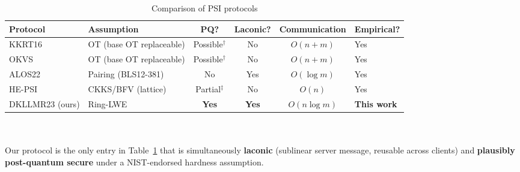 \begin{table}[H]
\centering
\caption{Comparison of PSI protocols}
\label{tab:psi-comparison}
\begin{tabular}{@{}llcccl@{}}
\toprule
\textbf{Protocol} & \textbf{Assumption} & \textbf{PQ?} & \textbf{Laconic?} & \textbf{Communication} & \textbf{Empirical?} \\
\midrule
KKRT16~\cite{kolesnikov2016kkrt}  & OT (base OT replaceable) & Possible$^\dagger$ & No  & $O(n + m)$ & Yes \\
OKVS~\cite{garimella2023okvs}     & OT (base OT replaceable) & Possible$^\dagger$ & No  & $O(n + m)$ & Yes \\
ALOS22~\cite{alos2022}            & Pairing (BLS12-381)      & No                 & Yes & $O(\log m)$ & Yes \\
HE-PSI~\cite{chen2017fhe}         & CKKS/BFV (lattice)       & Partial$^\ddagger$ & No  & $O(n)$      & Yes \\
DKLLMR23 (ours)                   & Ring-LWE                 & \textbf{Yes}       & \textbf{Yes} & \textbf{$O(n \log m)$} & \textbf{This work} \\
\bottomrule
\end{tabular}
\end{table}

\\
\\

Our protocol is the only entry in Table~\ref{tab:psi-comparison} that is
simultaneously \textbf{laconic} (sublinear server message, reusable across clients)
and \textbf{plausibly post-quantum secure} under a NIST-endorsed hardness assumption.

\clearpage
